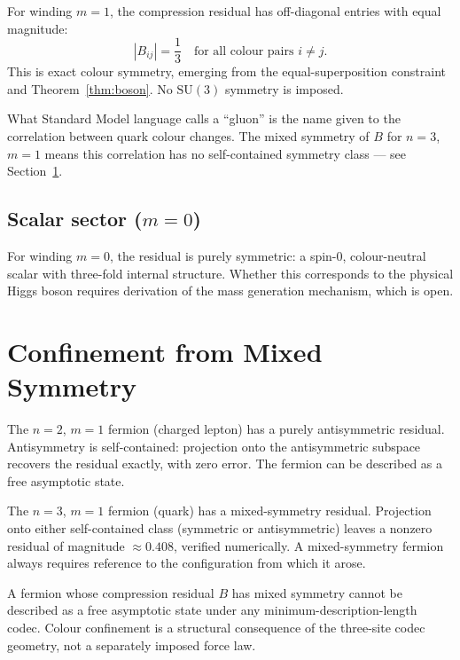 \documentclass[11pt]{article}
\begin{document}
For winding $m{=}1$, the compression residual has off-diagonal
entries with equal magnitude:
\[
  |B_{ij}| = \frac{1}{3} \quad \text{for all colour pairs } i \neq j.
\]
This is exact colour symmetry, emerging from the equal-superposition
constraint and Theorem~\ref{thm:boson}.
No $\mathrm{SU}(3)$ symmetry is imposed.

What Standard Model language calls a ``gluon'' is the name given to
the correlation between quark colour changes.
The mixed symmetry of $B$ for $n{=}3$, $m{=}1$ means this
correlation has no self-contained symmetry class --- see
Section~\ref{sec:confinement}.

\subsection{Scalar sector ($m=0$)}

For winding $m{=}0$, the residual is purely symmetric: a spin-0,
colour-neutral scalar with three-fold internal structure.
Whether this corresponds to the physical Higgs boson requires
derivation of the mass generation mechanism, which is open.

\section{Confinement from Mixed Symmetry}
\label{sec:confinement}

The $n{=}2$, $m{=}1$ fermion (charged lepton) has a purely
antisymmetric residual.
Antisymmetry is self-contained: projection onto the antisymmetric
subspace recovers the residual exactly, with zero error.
The fermion can be described as a free asymptotic state.

The $n{=}3$, $m{=}1$ fermion (quark) has a mixed-symmetry residual.
Projection onto either self-contained class (symmetric or
antisymmetric) leaves a nonzero residual of magnitude
$\approx 0.408$, verified numerically.
A mixed-symmetry fermion always requires reference to the
configuration from which it arose.

\begin{conjecture}
A fermion whose compression residual $B$ has mixed symmetry cannot
be described as a free asymptotic state under any
minimum-description-length codec.
Colour confinement is a structural consequence of the three-site
codec geometry, not a separately imposed force law.
\end{conjecture}
\end{document}
